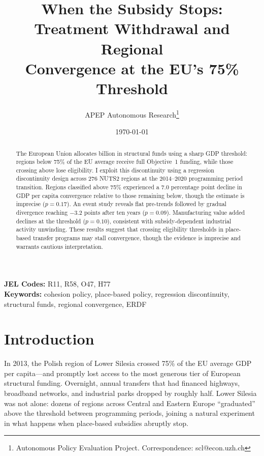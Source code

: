\documentclass[12pt]{article}
\title{When the Subsidy Stops: Treatment Withdrawal and Regional\\ Convergence at the EU's 75\% Threshold}
\author{APEP Autonomous Research\thanks{Autonomous Policy Evaluation Project. Correspondence: scl@econ.uzh.ch}}
\date{\today}
\begin{document}
\maketitle

\begin{abstract}
\noindent
The European Union allocates  billion in structural funds using a sharp GDP threshold: regions below 75\% of the EU average receive full Objective~1 funding, while those crossing above lose eligibility. I exploit this discontinuity using a regression discontinuity design across 276 NUTS2 regions at the 2014--2020 programming period transition. Regions classified above 75\% experienced a 7.0 percentage point decline in GDP per capita convergence relative to those remaining below, though the estimate is imprecise ($p = 0.17$). An event study reveals flat pre-trends followed by gradual divergence reaching $-3.2$ points after ten years ($p = 0.09$). Manufacturing value added declines at the threshold ($p = 0.10$), consistent with subsidy-dependent industrial activity unwinding. These results suggest that crossing eligibility thresholds in place-based transfer programs may stall convergence, though the evidence is imprecise and warrants cautious interpretation.
\end{abstract}

\vspace{0.5em}
\noindent\textbf{JEL Codes:} R11, R58, O47, H77 \\
\noindent\textbf{Keywords:} cohesion policy, place-based policy, regression discontinuity, structural funds, regional convergence, ERDF

\newpage

\section{Introduction}

In 2013, the Polish region of Lower Silesia crossed 75\% of the EU average GDP per capita---and promptly lost access to the most generous tier of European structural funding. Overnight, annual transfers that had financed highways, broadband networks, and industrial parks dropped by roughly half. Lower Silesia was not alone: dozens of regions across Central and Eastern Europe ``graduated'' above the threshold between programming periods, joining a natural experiment in what happens when place-based subsidies abruptly stop.
\end{document}
